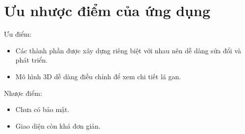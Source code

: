 \section{Ưu nhược điểm của ứng dụng}
Ưu điểm:\\
\begin{itemize}
    \item Các thành phần được xây dựng riêng biệt với nhau nên dễ dàng sửa đổi và phát triển.
    \item Mô hình 3D dễ dàng điều chỉnh để xem chi tiết lá gan.
\end{itemize}
Nhược điểm:\\
\begin{itemize}
    \item Chưa có bảo mật.
    \item Giao diện còn khá đơn giản.
\end{itemize}


